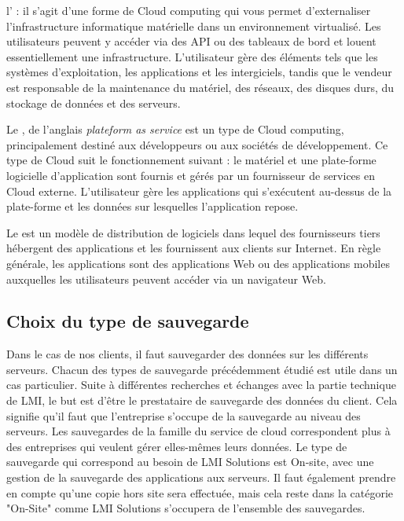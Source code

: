 \documentclass[pfe]{tnreport} %
\begin{document}
l' : il s'agit d'une forme de Cloud computing qui vous permet d'externaliser l'infrastructure informatique matérielle dans un environnement virtualisé.\newline
Les utilisateurs peuvent y accéder via des API ou des tableaux de bord et louent essentiellement une infrastructure. \newline
L'utilisateur gère des éléments tels que les systèmes d'exploitation, les applications et les intergiciels, tandis que le vendeur est responsable de la maintenance du matériel, des réseaux, des disques durs, du stockage de données et des serveurs.

Le , de l'anglais \textit{plateform as service} est un type de Cloud computing, principalement destiné aux développeurs ou aux sociétés de développement. \newline
Ce type de Cloud suit le fonctionnement suivant : le matériel et une plate-forme logicielle d'application sont fournis et gérés par un fournisseur de services en Cloud externe. \newline
L'utilisateur gère les applications qui s'exécutent au-dessus de la plate-forme et les données sur lesquelles l'application repose.

Le  est un modèle de distribution de logiciels dans lequel des fournisseurs tiers hébergent des applications et les fournissent aux clients sur Internet. \newline
En règle générale, les applications  sont des applications Web ou des applications mobiles auxquelles les utilisateurs peuvent accéder via un navigateur Web. \newline
\subsection{Choix du type de sauvegarde}

Dans le cas de nos clients, il faut sauvegarder des données sur les différents serveurs. \newline
Chacun des types de sauvegarde précédemment étudié est utile dans un cas particulier. \newline
Suite à différentes recherches et échanges avec la partie technique de LMI, le but est d'être le prestataire de sauvegarde des données du client. Cela signifie qu'il faut que l'entreprise s'occupe de la sauvegarde au niveau des serveurs. \newline
Les sauvegardes de la famille du service de cloud correspondent plus à des entreprises qui veulent gérer elles-mêmes leurs données. \newline
Le type de sauvegarde qui correspond au besoin de LMI Solutions est On-site, avec une gestion de la sauvegarde des applications aux serveurs. \newline
Il faut également prendre en compte qu'une copie hors site sera effectuée, mais cela reste dans la catégorie "On-Site" comme LMI Solutions s'occupera de l'ensemble des sauvegardes. 
\end{document}
